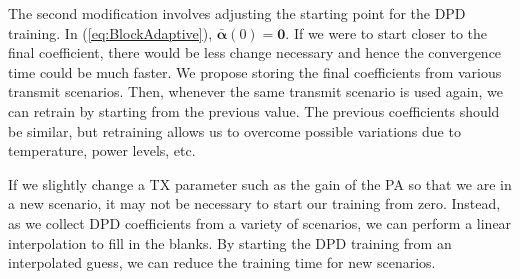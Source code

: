 The second modification involves adjusting the starting point for the DPD training. 
In (\ref{eq:BlockAdaptive}), $\bar{\boldsymbol{\alpha}}(0) = \mathbf{0}$. 
If we were to start closer to the final coefficient, there would be less change necessary and hence the convergence time could be much faster. 
We propose storing the final coefficients from various transmit scenarios. 
Then, whenever the same transmit scenario is used again, we can retrain by starting from the previous value. The previous coefficients should be similar, but retraining allows us to overcome possible variations due to temperature, power levels, etc. 

If we slightly change a TX parameter such as the gain of the PA so that we are in a new scenario, it may not be necessary to start our training from zero. Instead, as we collect DPD coefficients from a variety of scenarios, we can perform a linear interpolation to fill in the blanks. By starting the DPD training from an interpolated guess, we can reduce the training time for new scenarios.

